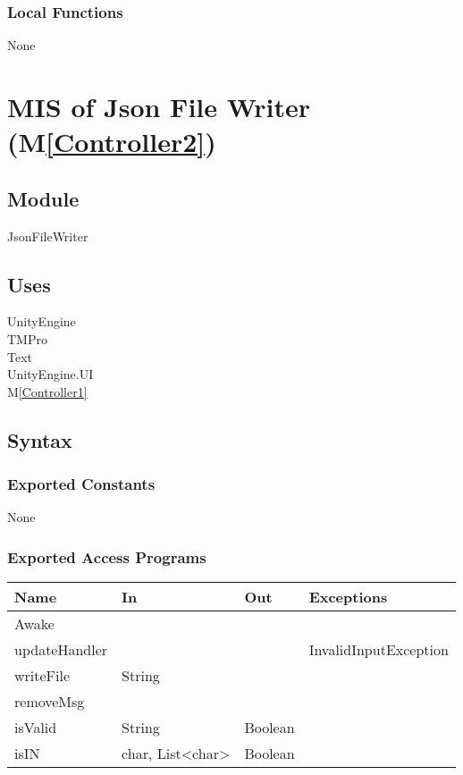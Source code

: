 \documentclass[12pt, titlepage]{article}
\newcommand{\mref}[1]{M\ref{#1}}
\begin{document}
\subsubsection{Local Functions}
None
\newpage

\section{MIS of Json File Writer (\mref{Controller2})} 

\subsection{Module}
JsonFileWriter
\subsection{Uses}
UnityEngine\\
TMPro\\
Text\\
UnityEngine.UI\\
\mref{Controller1}
\subsection{Syntax}

\subsubsection{Exported Constants}
None

\subsubsection{Exported Access Programs}
\begin{center}
\begin{tabular}{|p{3cm}|p{4cm}|p{4cm}| p{5cm}|}
\hline
\textbf{Name} & \textbf{In} & \textbf{Out} & \textbf{Exceptions} \\
\hline
 Awake& &  & \\
\hline
 updateHandler& &  & InvalidInputException\\
\hline
 writeFile& String&  & \\
\hline
 removeMsg& &  & \\
\hline
 isValid& String&  Boolean& \\
\hline
 isIN&char, List\textless char\textgreater &Boolean  & \\
\hline
\end{tabular}
\end{center}
\end{document}
